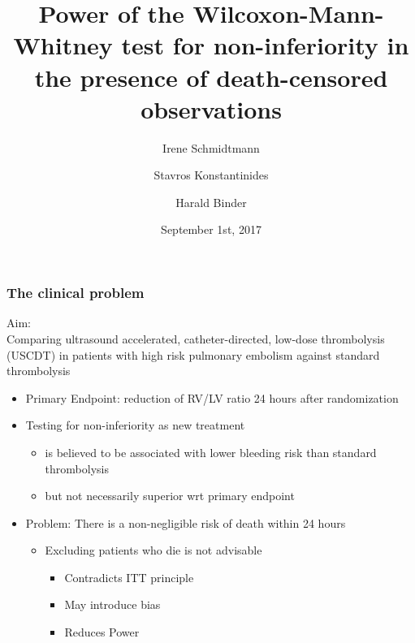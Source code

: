 \documentclass[xcolor=pdftex,dvipsnames,table]{beamer}\usepackage[]{graphicx}\usepackage[]{color}
\title{Power of the Wilcoxon-Mann-Whitney test for non-inferiority in the presence 
of death-censored observations} %
\author{Irene Schmidtmann\inst{1} \and 
Stavros Konstantinides\inst{2} \and 
Harald Binder\inst{3}}
\institute[University Medical Center Johannes-Gutenberg-University Mainz] %
{
  \inst{1}%
  Institute for Medical Biostatistics, Epidemiology and Informatics (IMBEI)
  \and
  \inst{2}%
  Center for Thrombosis and Hemostasis Mainz (CTH)\\
University Medical Center Johannes-Gutenberg-University Mainz
\and
\inst{3}%
Institute for Medical Biometry and Statistics  \\
University of Freiburg}
\date{September 1st, 2017}
\begin{document}


\begin{frame}[plain] %
\titlepage
\end{frame}

\begin{frame} %
\frametitle{The clinical problem}
Aim:\\
Comparing ultrasound accelerated, catheter-directed, low-dose thrombolysis (USCDT) in patients with high risk pulmonary embolism against standard thrombolysis
\begin{itemize}
	\item Primary Endpoint: reduction of RV/LV ratio 24 hours after randomization
	\item Testing for non-inferiority as new treatment
	\begin{itemize}
		\item is believed to be associated with lower bleeding risk than standard thrombolysis
		\item but not necessarily superior wrt primary endpoint
	\end{itemize}
	\item Problem: There is a non-negligible risk of death within 24 hours
	\begin{itemize}
		\item Excluding patients who die is not advisable
		\begin{itemize}
			\item Contradicts ITT principle
			\item May introduce bias
			\item Reduces Power
		\end{itemize}
	\end{itemize}
\end{itemize}
\end{frame}
\end{document}

